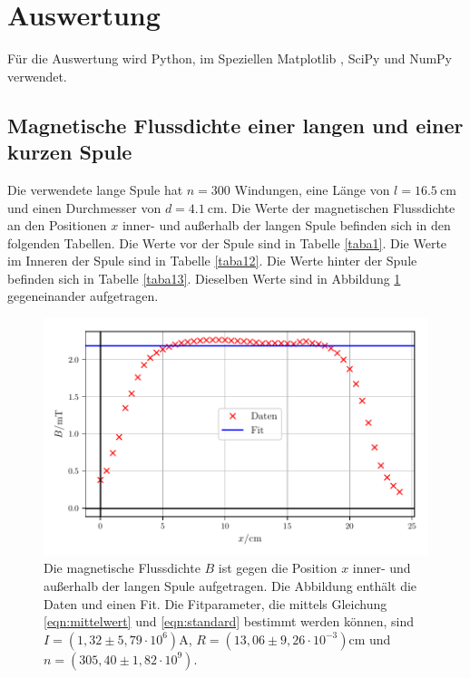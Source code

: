 \section{Auswertung}
\label{sec:Auswertung}

Für die Auswertung wird Python, im Speziellen Matplotlib \cite{matplotlib}, 
SciPy \cite{scipy} und NumPy \cite{numpy} verwendet.

\subsection{Magnetische Flussdichte einer langen und einer kurzen Spule}
Die verwendete lange Spule hat $n = \num{300}$ Windungen, eine Länge%
von $l = \SI{16.5}{\centi\meter}$ und einen Durchmesser von
$d = \SI{4.1}{\centi\meter}$.
Die Werte der magnetischen Flussdichte an den Positionen $x$ inner- und außerhalb
der langen Spule befinden sich in den folgenden Tabellen.
Die Werte vor der Spule sind in Tabelle \ref{taba1}. Die Werte im Inneren
der Spule sind in Tabelle \ref{taba12}. Die Werte hinter der Spule befinden
sich in Tabelle \ref{taba13}. %
Dieselben Werte sind in Abbildung \ref{plota1} gegeneinander aufgetragen.




\begin{figure}
    \centering
    \includegraphics{build/plota1.pdf}
    \caption{Die magnetische Flussdichte $B$ ist gegen die Position $x$ inner- 
    und außerhalb der langen Spule aufgetragen. Die Abbildung enthält die Daten
    und einen Fit. Die Fitparameter, die mittels Gleichung \eqref{eqn:mittelwert} und \eqref{eqn:standard}
    bestimmt werden können, sind $I = (1,32 \pm 5,79 \cdot 10^6) \si{\ampere}$,
    $R = (13,06 \pm 9,26 \cdot 10^{-3}) \si{\centi\meter}$ und $n = (305,40 \pm 1,82 \cdot 10^9)$.}
    \label{plota1}
\end{figure}

